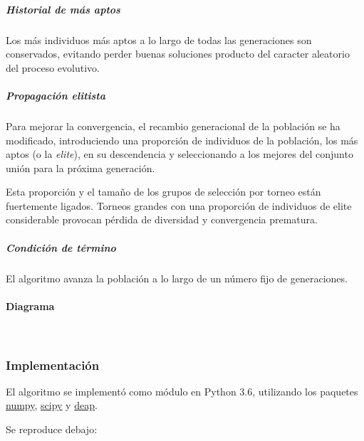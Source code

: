 \documentclass[11pt]{article}
\begin{document}
\subparagraph{Historial de más aptos}\label{historial-de-muxe1s-aptos}

Los más individuos más aptos a lo largo de todas las generaciones son
conservados, evitando perder buenas soluciones producto del caracter
aleatorio del proceso evolutivo.

\subparagraph{Propagación elitista}\label{propagaciuxf3n-elitista}

Para mejorar la convergencia, el recambio generacional de la población
se ha modificado, introduciendo una proporción de individuos de la
población, los más aptos (o la \emph{elite}), en su descendencia y
seleccionando a los mejores del conjunto unión para la próxima
generación.

Esta proporción y el tamaño de los grupos de selección por torneo están
fuertemente ligados. Torneos grandes con una proporción de individuos de
elite considerable provocan pérdida de diversidad y convergencia
prematura.

\subparagraph{Condición de término}\label{condiciuxf3n-de-tuxe9rmino}

El algoritmo avanza la población a lo largo de un número fijo de
generaciones.

\pagebreak

\paragraph{Diagrama}\label{diagrama}

    
    \begin{center}
    \end{center}
    { \hspace*{\fill} \\}
    

    \subsubsection{Implementación}\label{implementaciuxf3n}

El algoritmo se implementó como módulo en Python 3.6, utilizando los
paquetes \href{https://www.numpy.org/}{numpy},
\href{https://scipy.org/}{scipy} y
\href{https://deap.readthedocs.io/en/master/}{deap}.

Se reproduce debajo:

\hrulefill
\end{document}
